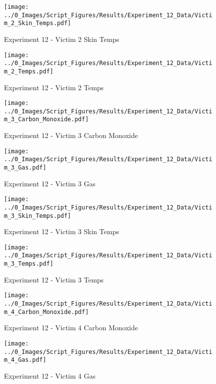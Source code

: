 	\clearpage

	\begin{figure}[H]
		\centering
		\texttt{[image: ../0\_Images/Script\_Figures/Results/Experiment\_12\_Data/Victim\_2\_Skin\_Temps.pdf]}
		\caption[]{Experiment 12 - Victim 2 Skin Temps}
	\end{figure}
 

	\begin{figure}[H]
		\centering
		\texttt{[image: ../0\_Images/Script\_Figures/Results/Experiment\_12\_Data/Victim\_2\_Temps.pdf]}
		\caption[]{Experiment 12 - Victim 2 Temps}
	\end{figure}
 
	\clearpage

	\begin{figure}[H]
		\centering
		\texttt{[image: ../0\_Images/Script\_Figures/Results/Experiment\_12\_Data/Victim\_3\_Carbon\_Monoxide.pdf]}
		\caption[]{Experiment 12 - Victim 3 Carbon Monoxide}
	\end{figure}
 

	\begin{figure}[H]
		\centering
		\texttt{[image: ../0\_Images/Script\_Figures/Results/Experiment\_12\_Data/Victim\_3\_Gas.pdf]}
		\caption[]{Experiment 12 - Victim 3 Gas}
	\end{figure}
 
	\clearpage

	\begin{figure}[H]
		\centering
		\texttt{[image: ../0\_Images/Script\_Figures/Results/Experiment\_12\_Data/Victim\_3\_Skin\_Temps.pdf]}
		\caption[]{Experiment 12 - Victim 3 Skin Temps}
	\end{figure}
 

	\begin{figure}[H]
		\centering
		\texttt{[image: ../0\_Images/Script\_Figures/Results/Experiment\_12\_Data/Victim\_3\_Temps.pdf]}
		\caption[]{Experiment 12 - Victim 3 Temps}
	\end{figure}
 
	\clearpage

	\begin{figure}[H]
		\centering
		\texttt{[image: ../0\_Images/Script\_Figures/Results/Experiment\_12\_Data/Victim\_4\_Carbon\_Monoxide.pdf]}
		\caption[]{Experiment 12 - Victim 4 Carbon Monoxide}
	\end{figure}
 

	\begin{figure}[H]
		\centering
		\texttt{[image: ../0\_Images/Script\_Figures/Results/Experiment\_12\_Data/Victim\_4\_Gas.pdf]}
		\caption[]{Experiment 12 - Victim 4 Gas}
	\end{figure}
 
